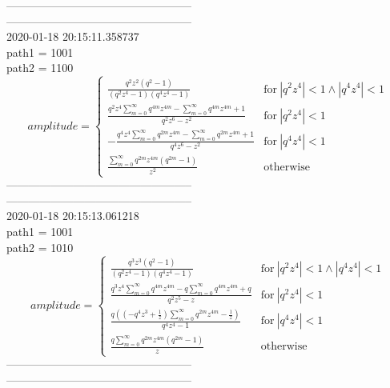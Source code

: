 --------------------------------------------------\\
--------------------------------------------------\\
2020-01-18 20:15:11.358737\\
path1 = 1001\\
path2 = 1100\\
$$amplitude = \begin{cases} \frac{q^{2} z^{2} \left(q^{2} - 1\right)}{\left(q^{2} z^{4} - 1\right) \left(q^{4} z^{4} - 1\right)} & \text{for}\: \left|{q^{2} z^{4}}\right| < 1 \wedge \left|{q^{4} z^{4}}\right| < 1 \\\frac{q^{2} z^{4} \sum_{m=0}^{\infty} q^{4 m} z^{4 m} - \sum_{m=0}^{\infty} q^{4 m} z^{4 m} + 1}{q^{2} z^{6} - z^{2}} & \text{for}\: \left|{q^{2} z^{4}}\right| < 1 \\- \frac{q^{4} z^{4} \sum_{m=0}^{\infty} q^{2 m} z^{4 m} - \sum_{m=0}^{\infty} q^{2 m} z^{4 m} + 1}{q^{4} z^{6} - z^{2}} & \text{for}\: \left|{q^{4} z^{4}}\right| < 1 \\\frac{\sum_{m=0}^{\infty} q^{2 m} z^{4 m} \left(q^{2 m} - 1\right)}{z^{2}} & \text{otherwise} \end{cases}$$
--------------------------------------------------\\
--------------------------------------------------\\
2020-01-18 20:15:13.061218\\
path1 = 1001\\
path2 = 1010\\
$$amplitude = \begin{cases} \frac{q^{3} z^{3} \left(q^{2} - 1\right)}{\left(q^{2} z^{4} - 1\right) \left(q^{4} z^{4} - 1\right)} & \text{for}\: \left|{q^{2} z^{4}}\right| < 1 \wedge \left|{q^{4} z^{4}}\right| < 1 \\\frac{q^{3} z^{4} \sum_{m=0}^{\infty} q^{4 m} z^{4 m} - q \sum_{m=0}^{\infty} q^{4 m} z^{4 m} + q}{q^{2} z^{5} - z} & \text{for}\: \left|{q^{2} z^{4}}\right| < 1 \\\frac{q \left(\left(- q^{4} z^{3} + \frac{1}{z}\right) \sum_{m=0}^{\infty} q^{2 m} z^{4 m} - \frac{1}{z}\right)}{q^{4} z^{4} - 1} & \text{for}\: \left|{q^{4} z^{4}}\right| < 1 \\\frac{q \sum_{m=0}^{\infty} q^{2 m} z^{4 m} \left(q^{2 m} - 1\right)}{z} & \text{otherwise} \end{cases}$$
--------------------------------------------------\\
--------------------------------------------------\\
